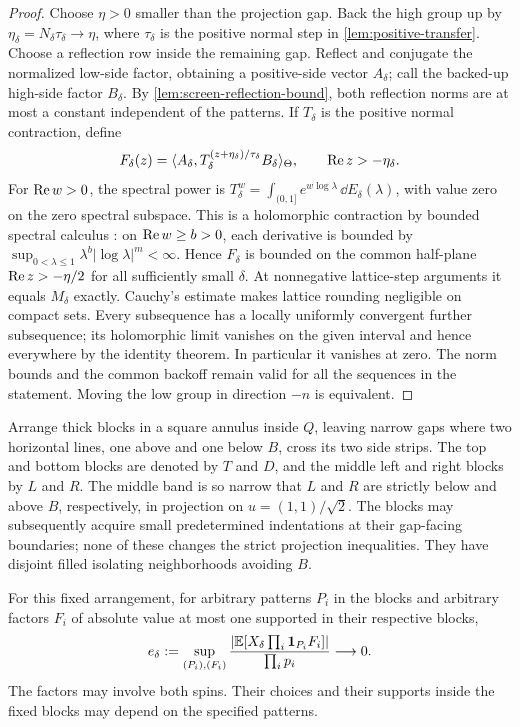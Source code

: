 \begin{proof}
Choose $\eta>0$ smaller than the projection gap. Back the high group up
by $\eta_\delta=N_\delta\tau_\delta\to\eta$, where $\tau_\delta$
is the positive normal step in \cref{lem:positive-transfer}. Choose a
reflection row inside the remaining gap. Reflect and conjugate the
normalized low-side factor, obtaining a positive-side vector $A_\delta$;
call the backed-up high-side factor $B_\delta$. By
\cref{lem:screen-reflection-bound}, both reflection norms are at most a
constant independent of the patterns. If $T_\delta$ is the positive
normal contraction, define
\[
 F_\delta(z)=
 \langle A_\delta,
 T_\delta^{(z+\eta_\delta)/\tau_\delta}B_\delta\rangle_\Theta,
 \qquad \mathop{\rm Re}z>-\eta_\delta.
\]
For $\mathop{\rm Re}w>0$, the spectral power is
$T_\delta^w=\int_{(0,1]}e^{w\log\lambda}\,\dd E_\delta(\lambda)$,
with value zero on the zero spectral subspace. This is a holomorphic
contraction by bounded spectral calculus
\cite[Proposition~5.3 and Corollary~5.7]{WilliamsSpectral2018}: on
$\mathop{\rm Re}w\ge b>0$, each derivative is bounded by
$\sup_{0<\lambda\le1}\lambda^b|\log\lambda|^m<\infty$. Hence $F_\delta$ is bounded on the common half-plane
$\mathop{\rm Re}z>-\eta/2$ for all sufficiently small $\delta$.
At nonnegative lattice-step arguments it equals $M_\delta$ exactly.
Cauchy's estimate makes lattice rounding negligible on compact sets.
Every subsequence has a locally uniformly convergent further subsequence;
its holomorphic limit vanishes on the given interval and hence everywhere
by the identity theorem. In particular it vanishes at zero. The norm
bounds and the common backoff remain valid for all the sequences in the
statement. Moving the low group in direction $-n$ is equivalent.
\end{proof}

Arrange thick blocks in a square annulus inside $Q$, leaving narrow gaps
where two horizontal lines, one above and one below $B$, cross its two
side strips. The top and bottom blocks are denoted by $T$ and $D$, and
the middle left and right blocks by $L$ and $R$. The middle band is so
narrow that $L$ and $R$ are strictly below and above $B$, respectively,
in projection on $u=(1,1)/\sqrt2$. The blocks may subsequently acquire
small predetermined indentations at their gap-facing boundaries; none
of these changes the strict projection inequalities. They have disjoint
filled isolating neighborhoods avoiding $B$.

\begin{lemma}
\label{lem:screen-gapped-identity}
For this fixed arrangement, for arbitrary patterns $P_i$ in the blocks
and arbitrary factors $F_i$ of absolute value at most one supported in
their respective blocks,
\begin{equation}
 e_\delta:=
 \sup_{(P_i),(F_i)}
 \frac{|\mathbb E[X_\delta\prod_i\mathbf 1_{P_i}F_i]|}{\prod_i p_i}
       \longrightarrow0.
 \label{eq:screen-gapped-identity}
\end{equation}
The factors may involve both spins. Their choices and their supports
inside the fixed blocks may depend on the specified patterns.
\end{lemma}

